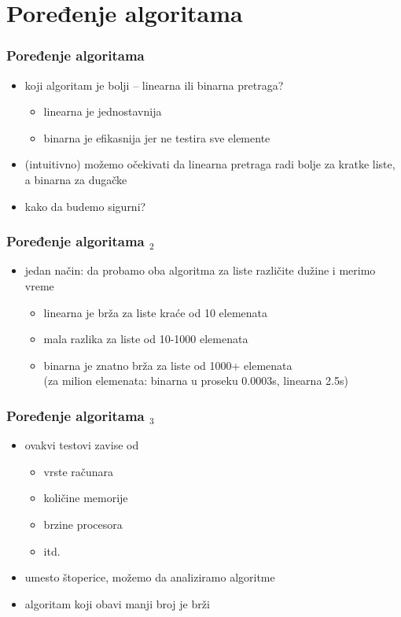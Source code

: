 \documentclass[utf8,compress]{beamer}
\begin{document}
\section[Poređenje]{Poređenje algoritama}

\begin{frame}[fragile]
  \frametitle{Poređenje algoritama}
  \begin{itemize}
    \item koji algoritam je bolji -- linearna ili binarna pretraga?
    \begin{itemize}
      \item linearna je jednostavnija
      \item binarna je efikasnija jer ne testira sve elemente
    \end{itemize}
    \item (intuitivno) možemo očekivati da linearna pretraga radi 
      bolje za kratke liste, a binarna za dugačke
    \item kako da budemo sigurni?
  \end{itemize}
\end{frame}

\begin{frame}[fragile]
  \frametitle{Poređenje algoritama $_2$}
  \begin{itemize}
    \item jedan način: da probamo oba algoritma za liste različite dužine 
       i merimo vreme
    \begin{itemize}
      \item linearna je brža za liste kraće od 10 elemenata
      \item mala razlika za liste od 10-1000 elemenata
      \item binarna je znatno brža za liste od 1000+ elemenata \\
        (za milion elemenata: binarna u proseku 0.0003s, linearna 2.5s)
    \end{itemize}
  \end{itemize}
\end{frame}

\begin{frame}[fragile]
  \frametitle{Poređenje algoritama $_3$}
  \begin{itemize}
    \item ovakvi testovi zavise od
    \begin{itemize}
      \item vrste računara
      \item količine memorije
      \item brzine procesora
      \item itd.
    \end{itemize}
    \item umesto štoperice, možemo da analiziramo algoritme
    \item algoritam koji obavi manji broj  je brži
  \end{itemize}
\end{frame}
\end{document}
